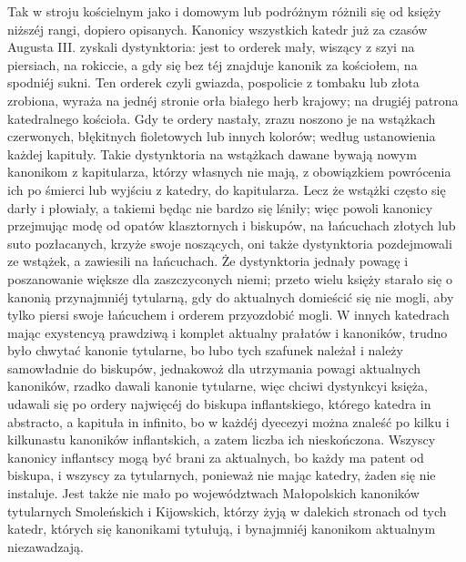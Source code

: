 \documentclass{book}
\begin{document}
Tak w stroju kościelnym jako i domowym lub podróżnym różnili się od księży niższéj rangi, dopiero opisanych. Kanonicy wszystkich katedr już za czasów Augusta III. zyskali dystynktoria: jest to orderek mały, wiszący z szyi na piersiach, na rokiccie, a gdy się bez téj znajduje kanonik za kościołem, na spodniéj sukni. Ten orderek czyli gwiazda, pospolicie z tombaku lub złota zrobiona, wyraża na jednéj stronie orła białego herb krajowy; na drugiéj patrona katedralnego kościoła. Gdy te ordery nastały, zrazu noszono je na wstążkach czerwonych, błękitnych fioletowych lub innych kolorów; według ustanowienia każdej kapituły. Takie dystynktoria na wstążkach dawane bywają nowym kanonikom z kapitularza, którzy własnych nie mają, z obowiązkiem powrócenia ich po śmierci lub wyjściu z katedry, do kapitularza. Lecz że wstążki często się darły i płowiały, a takiemi będąc nie bardzo się lśniły; więc powoli kanonicy przejmując modę od opatów klasztornych i biskupów, na łańcuchach złotych lub suto pozłacanych, krzyże swoje noszących, oni także dystynktoria pozdejmowali ze wstążek, a zawiesili na łańcuchach. Że dystynktoria jednały powagę i poszanowanie większe dla zaszczyconych niemi; przeto wielu księży starało się o kanonią przynajmniéj tytularną, gdy do aktualnych domieścić się nie mogli, aby tylko piersi swoje łańcuchem i orderem przyozdobić mogli. W innych katedrach mając exystencyą prawdziwą i komplet aktualny prałatów i kanoników, trudno było chwytać kanonie tytularne, bo lubo tych szafunek należał i należy samowładnie do biskupów, jednakowoż dla utrzymania powagi aktualnych kanoników, rzadko dawali kanonie tytularne, więc chciwi dystynkcyi księża, udawali się po ordery najwięcéj do biskupa inflantskiego, którego katedra in abstracto, a kapituła in infinito, bo w każdéj dyecezyi można znaleść po kilku i kilkunastu kanoników inflantskich, a zatem liczba ich nieskończona. Wszyscy kanonicy inflantscy mogą być brani za aktualnych, bo każdy ma patent od biskupa, i wszyscy za tytularnych, ponieważ nie mając katedry, żaden się nie instaluje. Jest także nie mało po województwach Małopolskich kanoników tytularnych Smoleńskich i Kijowskich, którzy żyją w dalekich stronach od tych katedr, których się kanonikami tytułują, i bynajmniéj kanonikom aktualnym niezawadzają.
\end{document}
